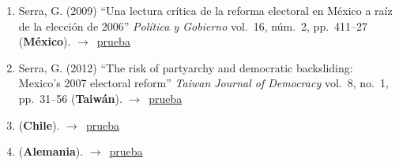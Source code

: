 \documentclass[12 pt, letter]{article}
\newenvironment{CitasMiTrabajo}{
    \begin{footnotesize}
    \begin{enumerate}[label={\footnotesize\emph{cita~\arabic*}},ref=\arabic*] %
        \setlength{\itemsep}{.1\itemsep}
        \setlength{\parskip}{.1\parskip}
    }{\end{enumerate}\end{footnotesize}}
\begin{document}
        \begin{CitasMiTrabajo}

        \item Serra, G. (2009)
        ``Una lectura cr\'itica de la reforma electoral en M\'exico a ra\'iz de la elecci\'on de 2006''
        \emph{Pol\'itica y Gobierno} vol.\ 16, n\'um.\ 2, pp.\ 411--27
        (\textbf{M\'exico}). $\rightarrow$~\href{http://ericmagar.com/cv/cites/magarRomero2007rcp/serra2009pyg.pdf}{prueba}

        \item Serra, G. (2012)
            ``The risk of partyarchy and democratic backsliding: Mexico's 2007 electoral reform''
            \emph{Taiwan Journal of Democracy}
            vol.\ 8, no.\ 1, pp.\ 31--56 (\textbf{Taiw\'an}). $\rightarrow$~\href{http://ericmagar.com/cv/cites/estevezEtalElecStud/serraElecRefMexico2012tjd.pdf}{prueba}

        \item {} (\textbf{Chile}). $\rightarrow$~\href{http://ericmagar.com/cv/cites/magarRomero2007rcp/hdzhdzGeoespacialElecFCH2015.pdf}{prueba}

        \item {} (\textbf{Alemania}). $\rightarrow$~\href{http://ericmagar.com/cv/cites/magarRomero2007rcp/heisig2015.pdf}{prueba}

        \label{ncites:magar.romero.rcp.2007} %

        \end{CitasMiTrabajo}



\end{document}
